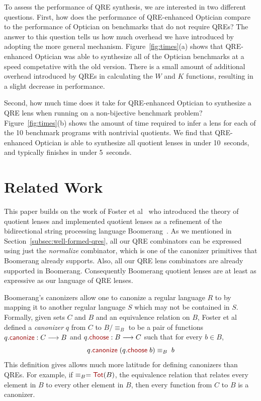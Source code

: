 \documentclass[acmsmall,review,anonymous]{acmart}
\newcommand{\kw}[1]{\textcolor{dkred}{\ensuremath{\mathsf{#1}}}}
\newcommand{\QOpt}{QRE-enhanced Optician}
\begin{document}
To assess the performance of QRE synthesis, we are interested in two different
questions. First, how does the performance of \QOpt{} compare to the performance
of Optician on benchmarks that do not require QREs? The answer to this question
tells us how much overhead we have introduced by adopting the more general
mechanism. Figure~\ref{fig:times}(a) shows that \QOpt{} was able to synthesize
all of the Optician benchmarks at a speed competative with the old version.
There is a small amount of additional overhead introduced by QREs in calculating
the $W$ and $K$ functions, resulting in a slight decrease in performance.

Second, how much time does it take for \QOpt{} to synthesize a QRE
lens when running on a non-bijective benchmark problem?  
Figure~\ref{fig:times}(b) shows the amount of time required to infer a
lens for each of the 10 benchmark programs with nontrivial quotients.  
We find that \QOpt{} is able to synthesize all quotient lenses in
under 10~seconds, and typically finishes in under 5~seconds.

\section{Related Work}
\label{relwork}
This paper builds on the work of Foster et al~\cite{quotientlenses} who
introduced the theory of quotient lenses and implemented quotient lenses as a
refinement of the bidirectional string processing language
Boomerang~\cite{boomerang}. As we mentioned in
Section~\ref{subsec:well-formed-qres}, all our QRE combinators can be expressed
using just the {\em normalize} combinator, which is one of the canonizer
primitives that Boomerang already supports. Also, all our QRE lens combinators
are already supported in Boomerang. Consequently Boomerang quotient lenses are
at least as expressive as our language of QRE lenses. 

Boomerang's canonizers allow one to canonize a regular language $R$ to by
mapping it to another regular language $S$ which may not be contained in $S$.
Formally, given sets $C$ and $B$ and an equivalence relation on $B$, Foster et
al defined a {\em canonizer} $q$ from $C$ to $B/{\equiv_B}$ to be a pair of
functions $q.\kw{canonize} : C \longrightarrow B$ and $q.\kw{choose} : B
\longrightarrow C$ such that for every $b \in B$,
$$q.\kw{canonize} \; (q.\kw{choose} \; b) \equiv_B \; b$$
This definition gives allows much more latitude for defining canonizers than
QREs. For example, if $\equiv_B = \kw{Tot}(B)$, the equivalence relation that
relates every element in $B$ to every other element in $B$, then every function
from $C$ to $B$ is a canonizer.
\end{document}
